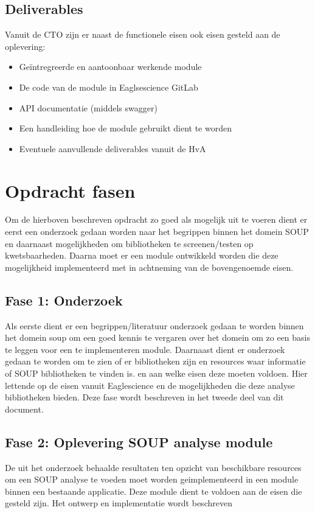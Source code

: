 \subsection{Deliverables}
Vanuit de CTO zijn er naast de functionele eisen ook eisen gesteld aan de oplevering:
\begin{itemize}
\item Geïntregreerde en aantoonbaar werkende module
\item De code van de module in Eaglsescience GitLab
\item API documentatie (middels swagger)
\item Een handleiding hoe de module gebruikt dient te worden
\item Eventuele aanvullende deliverables vanuit de HvA
\end{itemize}


\section{Opdracht fasen}
Om de hierboven beschreven opdracht zo goed als mogelijk uit te voeren dient er eerst een onderzoek gedaan worden naar het begrippen binnen het domein SOUP en daarnaast mogelijkheden om bibliotheken te screenen/testen op kwetsbaarheden. Daarna moet er een module ontwikkeld worden die deze mogelijkheid implementeerd met in achtneming van de bovengenoemde eisen.
\subsection{Fase 1: Onderzoek}
Als eerste dient er een begrippen/literatuur onderzoek gedaan te worden binnen het domein soup om een goed kennis te vergaren over het domein om zo een basis te leggen voor een te implementeren module. Daarnaast dient er onderzoek gedaan te worden om te zien of er bibliotheken zijn en resources waar informatie of SOUP bibliotheken te vinden is. en aan welke eisen deze moeten voldoen. Hier lettende op de eisen vanuit Eaglescience en de mogelijkheden die deze analyse bibliotheken bieden. Deze fase wordt beschreven in het tweede deel van dit document.

\subsection{Fase 2: Oplevering SOUP analyse module}
De uit het onderzoek behaalde resultaten ten opzicht van beschikbare resources om een SOUP analyse te voeden moet worden geimplementeerd in een module binnen een bestaande applicatie. Deze module dient te voldoen aan de eisen die gesteld zijn. Het ontwerp en implementatie wordt beschreven

